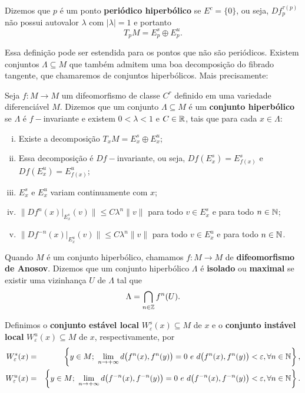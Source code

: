 Dizemos que $p$ é um ponto \textbf{periódico hiperbólico} se $E^c=\{0\}$, ou seja, $Df_p^{\tau(p)}$ não possui autovalor $\lambda$ com $|\lambda|=1$ e portanto 
\begin{equation*}
T_pM=E_p^s\oplus E_p^u.
\end{equation*}

Essa definição pode ser estendida para os pontos que não são periódicos. Existem conjuntos $\Lambda\subseteq M$ que também admitem uma boa decomposição do fibrado tangente, que chamaremos de conjuntos hiperbólicos. Mais precisamente:

\begin{definicao} Seja $f:M\to M$ um difeomorfismo de classe $C^r$ definido em uma variedade diferenciável $M$. Dizemos que um conjunto $\Lambda\subseteq M$ é um \textbf{conjunto hiperbólico} se $\Lambda$ é $f-$invariante e existem $0<\lambda<1$ e $C\in\mathbb{R}$, tais que para cada $x\in\Lambda$:
\begin{enumerate}[i)]
\item Existe a decomposição $T_xM=E_x^s\oplus E_x^u$;
\item Essa decomposição é $Df-$invariante, ou seja, $Df(E_x^s)=E_{f(x)}^s$ e $Df(E_x^u)=E_{f(x)}^u$;
\item $E^s_x$ e $E^u_x$ variam continuamente com $x$;
\item $\|Df^n(x)|_{E_x^s}(v)\|\leq C\lambda^n\|v\|$ para todo $v\in E^s_x$ e para todo $n\in\mathbb{N}$;
\item $\|Df^{-n}(x)|_{E_x^u}(v)\|\leq C\lambda^n\|v\|$ para todo $v\in E^u_x$ e para todo $n\in\mathbb{N}$.
\end{enumerate}
\end{definicao}

Quando $M$ é um conjunto hiperbólico, chamamos $f:M\to M$ de \textbf{difeomorfismo de Anosov}. Dizemos que um conjunto hiperbólico $\Lambda$ é \textbf{isolado} ou \textbf{maximal} se existir uma vizinhança $U$ de $\Lambda$ tal que $$\Lambda=\bigcap_{n\in\mathbb{Z}}f^n(U).$$ 

Definimos o \textbf{conjunto estável local} $W^s_{\varepsilon}(x)\subseteq M$ de $x$ e o \textbf{conjunto instável local} $W^u_{\varepsilon}(x)\subseteq M$ de $x$, respectivamente, por
\begin{eqnarray*}
W^s_{\varepsilon}(x) & = & \left\{y\in M;\ \lim_{n\to+\infty}d\big(f^n(x),f^n(y)\big)=0\ e\ d\big(f^n(x),f^n(y)\big)<\varepsilon,\forall n\in\N\right\},\\
W^u_{\varepsilon}(x) & = & \left\{y\in M;\ \lim_{n\to+\infty}d\big(f^{-n}(x),f^{-n}(y)\big)=0\ e \ d\big(f^{-n}(x),f^{-n}(y)\big)<\varepsilon,\forall n\in\N\right\}.
\end{eqnarray*}

